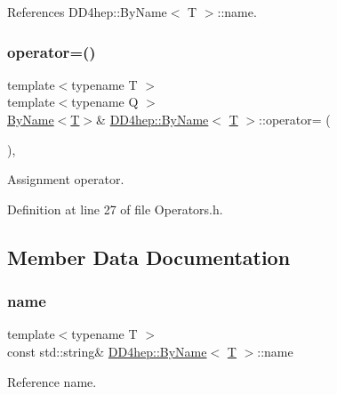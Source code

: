 References D\+D4hep\+::\+By\+Name$<$ T $>$\+::name.

\hypertarget{class_d_d4hep_1_1_by_name_a3c4a00bee4c7a1128557fe044ebb8e9d}{}\label{class_d_d4hep_1_1_by_name_a3c4a00bee4c7a1128557fe044ebb8e9d} 
\subsubsection{\texorpdfstring{operator=()}{operator=()}}
{\footnotesize\ttfamily template$<$typename T $>$ \\
template$<$typename Q $>$ \\
\hyperlink{class_d_d4hep_1_1_by_name}{By\+Name}$<$\hyperlink{class_t}{T}$>$\& \hyperlink{class_d_d4hep_1_1_by_name}{D\+D4hep\+::\+By\+Name}$<$ \hyperlink{class_t}{T} $>$\+::operator= (\begin{DoxyParamCaption}\item[{const \hyperlink{class_d_d4hep_1_1_by_name}{By\+Name}$<$ Q $>$ \&}]{ }\end{DoxyParamCaption})\hspace{0.3cm}{\ttfamily [inline]}, {\ttfamily [private]}}



Assignment operator. 



Definition at line 27 of file Operators.\+h.



\subsection{Member Data Documentation}
\hypertarget{class_d_d4hep_1_1_by_name_a06f4c668c9195f670ee1ace07191efa1}{}\label{class_d_d4hep_1_1_by_name_a06f4c668c9195f670ee1ace07191efa1} 
\subsubsection{\texorpdfstring{name}{name}}
{\footnotesize\ttfamily template$<$typename T $>$ \\
const std\+::string\& \hyperlink{class_d_d4hep_1_1_by_name}{D\+D4hep\+::\+By\+Name}$<$ \hyperlink{class_t}{T} $>$\+::name}



Reference name. 



